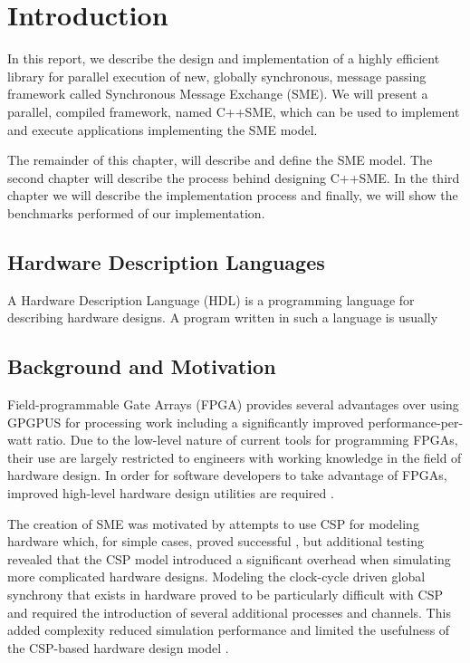\chapter{Introduction}

In this report, we describe the design and implementation of a highly
efficient library for parallel execution of new, globally synchronous,
message passing framework called Synchronous Message Exchange
(SME). We will present a parallel, compiled framework, named
C++SME, which can be used to implement and execute applications
implementing the SME model.

The remainder of this chapter, will describe and define the SME
model. The second chapter will describe the process behind designing
C++SME. In the third chapter we will describe the implementation
process and finally, we will show the benchmarks performed of our
implementation. 


\section{Hardware Description Languages}
A Hardware Description Language (HDL) is a programming language for
describing hardware designs. A program written in such a language is
usually

\section{Background and Motivation}
Field-programmable Gate Arrays (FPGA) provides several advantages over
using GPGPUS for processing work including a significantly improved
performance-per-watt ratio. Due to the low-level nature of current
tools for programming FPGAs, their use are largely restricted to
engineers with working knowledge in the field of hardware design. In
order for software developers to take advantage of FPGAs, improved
high-level hardware design utilities are required \cite{bacon2013fpga}.

The creation of SME was motivated by attempts to use CSP for modeling
hardware which, for simple cases, proved successful
\cite{rehr2013bpu}, but additional testing revealed that the CSP model
introduced a significant overhead when simulating more complicated
hardware designs. Modeling the clock-cycle driven global synchrony
that exists in hardware proved to be particularly difficult with CSP
and required the introduction of several additional processes and
channels. This added complexity reduced simulation performance and
limited the usefulness of the CSP-based hardware design model \cite{vinter2014synchronous}.

